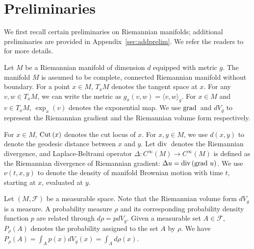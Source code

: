 \section{Preliminaries}\label{prelim}
We first recall certain preliminaries on Riemannian manifolds; additional preliminaries are provided in Appendix~\ref{sec:addprelim}. We refer the readers to~\cite{lee2018introduction} for more details. 

Let $M$ be a Riemannian manifold of dimension $d$ equipped with metric $g$. The manifold $M$ is assumed to be complete, connected Riemannian manifold without boundary. For a point $x \in M$, $T_{x}M$ denotes the tangent space at $x$. For any $v, w \in T_{x}M$, we can write the metric as  $g_{x}(v, w) = \langle v, w\rangle_{g}$. For $x \in M$ and $v \in T_{x}M$, $\exp_{x}(v)$ denotes the exponential map. We use $\operatorname{grad\,}$ and $dV_{g}$ to represent the Riemannian gradient and the Riemannian volume form respectively.  

For $x \in M$, $\operatorname{Cut\,}(x)$ denotes the cut locus of $x$.
For $x, y \in M$, we use $d(x, y)$ to denote the geodesic distance between $x$ and $y$.
Let $\operatorname{div\,}$ denotes the Riemannian divergence, and Laplace-Beltrami operator $\Delta : C^{\infty} (M) \to C^{\infty} (M)$ 
is defined as the Riemannian divergence of Riemannian gradient: $ \Delta u = \operatorname{div\,} (\operatorname{grad\,} u)$. We use $\nu(t, x, y)$ to denote the density of manifold Brownian motion with time $t$, starting at $x$, evaluated at $y$. 




Let $(M, \mathcal{F})$ be a measurable space.
Note that the Riemannian volume form $dV_{g}$ is a measure. A probability measure $\rho$ and its corresponding probability density function $p$ are related through $d\rho = p dV_{g}$. Given a measurable set $A \in \mathcal{F}$, $P_{\rho}(A)$ denotes the probability assigned to the set $A$ by $\rho$. We have $P_{\rho}(A) = \int_{A} p(x) dV_{g}(x) = \int_{A} d\rho(x)$.

